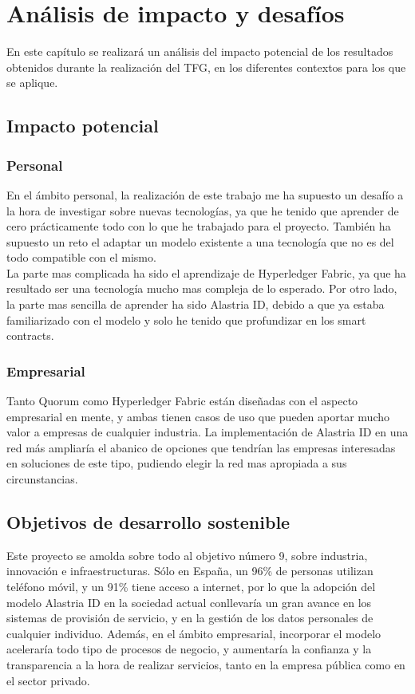 \chapter{Análisis de impacto y desafíos}
En este capítulo se realizará un análisis del impacto potencial de los resultados obtenidos durante la realización del TFG, en los diferentes contextos para los que se aplique.
\section{Impacto potencial}
\subsection{Personal}
En el ámbito personal, la realización de este trabajo me ha supuesto un desafío a la hora de investigar sobre nuevas tecnologías, ya que he tenido que aprender de cero prácticamente todo con lo que he trabajado para el proyecto. También ha supuesto un reto el adaptar un modelo existente a una tecnología que no es del todo compatible con el mismo.\\
La parte mas complicada ha sido el aprendizaje de Hyperledger Fabric, ya que ha resultado ser una tecnología mucho mas compleja de lo esperado. Por otro lado, la parte mas sencilla de aprender ha sido Alastria ID, debido a que ya estaba familiarizado con el modelo y solo he tenido que profundizar en los smart contracts.
\subsection{Empresarial}
Tanto Quorum como Hyperledger Fabric están diseñadas con el aspecto empresarial en mente, y ambas tienen casos de uso que pueden aportar mucho valor a empresas de cualquier industria. La implementación de Alastria ID en una red más ampliaría el abanico de opciones que tendrían las empresas interesadas en soluciones de este tipo, pudiendo elegir la red mas apropiada a sus circunstancias.
\clearpage
\section{Objetivos de desarrollo sostenible}
Este proyecto se amolda sobre todo al objetivo número 9, sobre industria, innovación e infraestructuras. Sólo en España, un 96\% de personas utilizan teléfono móvil, y un 91\% tiene acceso a internet, por lo que la adopción del modelo Alastria ID en la sociedad actual conllevaría un gran avance en los sistemas de provisión de servicio, y en la gestión de los datos personales de cualquier individuo. Además, en el ámbito empresarial, incorporar el modelo aceleraría todo tipo de procesos de negocio, y aumentaría la confianza y la transparencia a la hora de realizar servicios, tanto en la empresa pública como en el sector privado.

